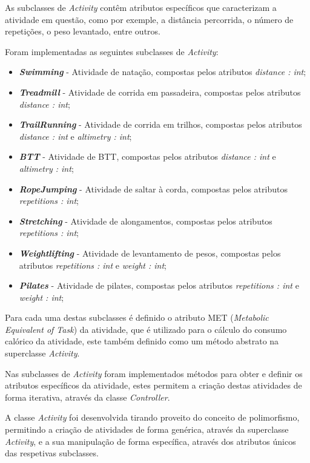 \documentclass[a4paper,12pt]{scrreprt}
\begin{document}
    As subclasses de \textit{Activity} contêm atributos específicos que caracterizam a atividade em questão,
    como por exemple, a distância percorrida, o número de repetições, o peso levantado, entre outros.

    Foram implementadas as seguintes subclasses de \textit{Activity}:
    \begin{itemize}
        \item \textit{\textbf{Swimming}} - Atividade de natação, compostas pelos atributos \textit{distance : int};
        \item \textit{\textbf{Treadmill}} - Atividade de corrida em passadeira, compostas pelos atributos \textit{distance : int};
        \item \textit{\textbf{TrailRunning}} - Atividade de corrida em trilhos, compostas pelos atributos \textit{distance : int} e \textit{altimetry : int};
        \item \textit{\textbf{BTT}} - Atividade de BTT, compostas pelos atributos \textit{distance : int} e \textit{altimetry : int};
        \item \textit{\textbf{RopeJumping}} - Atividade de saltar à corda, compostas pelos atributos \textit{repetitions : int};
        \item \textit{\textbf{Stretching}} - Atividade de alongamentos, compostas pelos atributos \textit{repetitions : int};
        \item \textit{\textbf{Weightlifting}} - Atividade de levantamento de pesos, compostas pelos atributos \textit{repetitions : int} e \textit{weight : int};
        \item \textit{\textbf{Pilates}} - Atividade de pilates, compostas pelos atributos \textit{repetitions : int} e \textit{weight : int};
    \end{itemize}

    Para cada uma destas subclasses é definido o atributo MET (\textit{Metabolic Equivalent of Task}) da atividade,
    que é utilizado para o cálculo do consumo calórico da atividade,
    este também definido como um método abstrato na superclasse \textit{Activity}.

    Nas subclasses de \textit{Activity} foram implementados métodos para obter e definir os atributos específicos da atividade,
    estes permitem a criação destas atividades de forma iterativa, através da classe \textit{Controller}.

    A classe \textit{Activity} foi desenvolvida tirando proveito do conceito de polimorfismo,
    permitindo a criação de atividades de forma genérica, através da superclasse \textit{Activity},
    e a sua manipulação de forma específica, através dos atributos únicos das respetivas subclasses.
\end{document}
